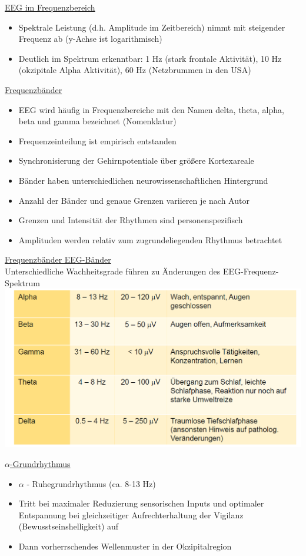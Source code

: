 \documentclass[a4paper,10pt,oneside]{article}
\begin{document}
\underline{EEG im Frequenzbereich} \\
	\begin{itemize}
		\item Spektrale Leistung (d.h. Amplitude im Zeitbereich) nimmt mit steigender Frequenz ab (y-Achse ist logarithmisch) 
		\item Deutlich im Spektrum erkenntbar: 1 Hz (stark frontale Aktivität), 10 Hz (okzipitale Alpha Aktivität), 60 Hz (Netzbrummen in den USA)
	\end{itemize}
 
\underline{Frequenzbänder} \\	
	\begin{itemize}
		\item EEG wird häufig in Frequenzbereiche mit den Namen delta, theta, alpha, beta und gamma bezeichnet (Nomenklatur)
		\item Frequenzeinteilung ist empirisch entstanden
		\item Synchronisierung der Gehirnpotentiale über größere Kortexareale
		\item Bänder haben unterschiedlichen neurowissenschaftlichen Hintergrund
		\item Anzahl der Bänder und genaue Grenzen variieren je nach Autor
		\item Grenzen und Intensität der Rhythmen sind personenspezifisch 
		\item Amplituden werden relativ zum zugrundeliegenden Rhythmus betrachtet
	\end{itemize}
	
\underline{Frequenzbänder EEG-Bänder} \\
Unterschiedliche Wachheitsgrade führen zu Änderungen des EEG-Frequenz-Spektrum
\includegraphics[scale=0.2]{Grafiken/1931.png}
 
\underline{$\alpha$-Grundrhythmus} \\
	\begin{itemize}
		\item $\alpha$ - Ruhegrundrhythmus (ca. 8-13 Hz)
		\item Tritt bei maximaler Reduzierung sensorischen Inputs und optimaler Entspannung bei gleichzeitiger Aufrechterhaltung der Vigilanz (Bewusstseinshelligkeit) auf
		\item Dann vorherrschendes Wellenmuster in der Okzipitalregion
	\end{itemize}
	
\end{document}
